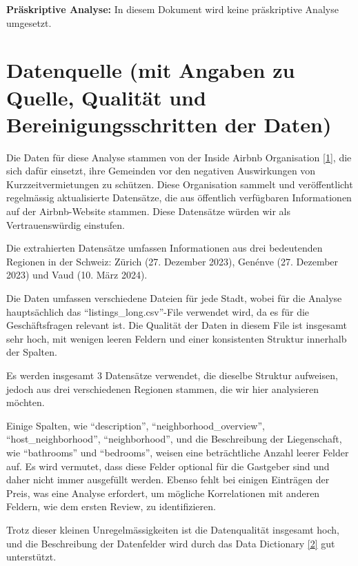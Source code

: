 \documentclass[
  journal,
]{IEEEtran}%
\begin{document}
\textbf{Präskriptive Analyse:} In diesem Dokument wird keine
präskriptive Analyse umgesetzt.

\hypertarget{datenquelle-mit-angaben-zu-quelle-qualituxe4t-und-bereinigungsschritten-der-daten}{%
\section{Datenquelle (mit Angaben zu Quelle, Qualität und
Bereinigungsschritten der
Daten)}\label{datenquelle-mit-angaben-zu-quelle-qualituxe4t-und-bereinigungsschritten-der-daten}}

Die Daten für diese Analyse stammen von der Inside Airbnb Organisation
\protect\hyperlink{ref-inside-airbnb-2023}{{[}1{]}}, die sich dafür
einsetzt, ihre Gemeinden vor den negativen Auswirkungen von
Kurzzeitvermietungen zu schützen. Diese Organisation sammelt und
veröffentlicht regelmässig aktualisierte Datensätze, die aus öffentlich
verfügbaren Informationen auf der Airbnb-Website stammen. Diese
Datensätze würden wir als Vertrauenswürdig einstufen.

Die extrahierten Datensätze umfassen Informationen aus drei bedeutenden
Regionen in der Schweiz: Zürich (27. Dezember 2023), Genénve (27.
Dezember 2023) und Vaud (10. März 2024).

Die Daten umfassen verschiedene Dateien für jede Stadt, wobei für die
Analyse hauptsächlich das ``listings\_long.csv''-File verwendet wird, da
es für die Geschäftsfragen relevant ist. Die Qualität der Daten in
diesem File ist insgesamt sehr hoch, mit wenigen leeren Feldern und
einer konsistenten Struktur innerhalb der Spalten.

Es werden insgesamt 3 Datensätze verwendet, die dieselbe Struktur
aufweisen, jedoch aus drei verschiedenen Regionen stammen, die wir hier
analysieren möchten.

Einige Spalten, wie ``description'', ``neighborhood\_overview'',
``host\_neighborhood'', ``neighborhood'', und die Beschreibung der
Liegenschaft, wie ``bathrooms'' und ``bedrooms'', weisen eine
beträchtliche Anzahl leerer Felder auf. Es wird vermutet, dass diese
Felder optional für die Gastgeber sind und daher nicht immer ausgefüllt
werden. Ebenso fehlt bei einigen Einträgen der Preis, was eine Analyse
erfordert, um mögliche Korrelationen mit anderen Feldern, wie dem ersten
Review, zu identifizieren.

Trotz dieser kleinen Unregelmässigkeiten ist die Datenqualität insgesamt
hoch, und die Beschreibung der Datenfelder wird durch das Data
Dictionary \protect\hyperlink{ref-inside-airbnb-2022}{{[}2{]}} gut
unterstützt.
\end{document}
